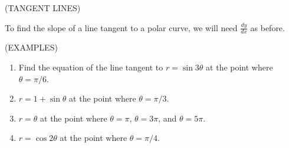 \documentclass[11pt]{article}
\begin{document}
(TANGENT LINES)

To find the slope of a line tangent to a polar curve, we will need $\frac{dy}{dx}$ as before.

\vspace{2in}

  (EXAMPLES)
\begin{enumerate}


\item{Find the equation of the line tangent to $r =\sin{3\theta}$ at the point where $\theta=\pi/6$.}

  \pagebreak
  
\item{$r = 1 + \sin{\theta}$ at the point where $\theta=\pi/3$.}
\vspace{2.5in}
\item{$r = \theta$ at the point where $\theta=\pi$, $\theta=3\pi$, and $\theta=5\pi$.}
\vspace{3.5in}
\item{$r = \cos{2\theta}$ at the point where $\theta=\pi/4$.}
\end{enumerate}
\end{document}
